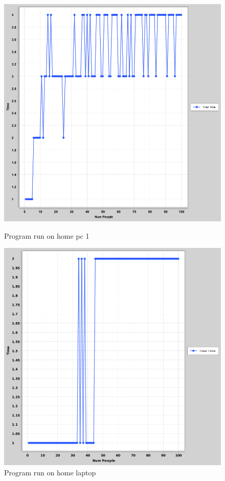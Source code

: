 \documentclass[a4paper, 12pt]{article}
\begin{document}
		\begin{figure}[H]
  				\includegraphics[width=\linewidth]{numpeople-vs-time(homepc1)}
  				\caption{Program run on home pc 1}
			\endminipage\hfill
  				\includegraphics[width=\linewidth]{numpeople-vs-time(split-for-unvisted)2}
  				\caption{Program run on home laptop}
				\endminipage\hfill
		\end{figure}
			
\end{document}
